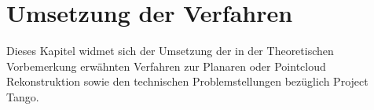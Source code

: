 \chapter{Umsetzung der Verfahren}

Dieses Kapitel widmet sich der Umsetzung der in der Theoretischen Vorbemerkung erwähnten Verfahren zur Planaren oder Pointcloud Rekonstruktion sowie den technischen Problemstellungen bezüglich Project Tango.








